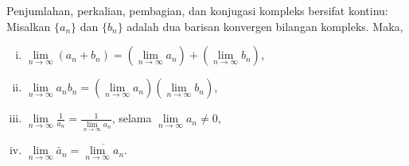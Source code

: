 
\begin{prop}
Penjumlahan, perkalian, pembagian, dan konjugasi kompleks bersifat kontinu:
Misalkan $\{ a_n \}$ dan $\{ b_n \}$ adalah dua barisan konvergen
bilangan kompleks. Maka,
\begin{enumerate}[(i)]
\item
$\lim\limits_{n\to\infty} (a_n + b_n) = 
\left(\lim\limits_{n\to\infty} a_n \right) +
\left(\lim\limits_{n\to\infty} b_n \right)$,
\item
$\lim\limits_{n\to\infty} a_n b_n = 
\left(\lim\limits_{n\to\infty} a_n \right)
\left(\lim\limits_{n\to\infty} b_n \right)$,
\item
$\lim\limits_{n\to\infty} \frac{1}{a_n} = \frac{1}{\lim\limits_{n\to\infty} a_n}$,
selama $\lim\limits_{n\to\infty} a_n \neq 0$,
\item
$\lim\limits_{n\to\infty} \bar{a}_n = 
\overline{\lim\limits_{n\to\infty} a_n}$.
\end{enumerate}
\end{prop}
